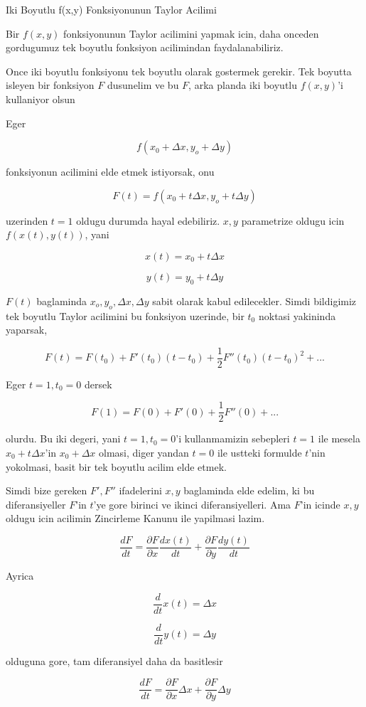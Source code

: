 \documentclass[12pt,fleqn]{article}\usepackage{../common}
\begin{document}
Iki Boyutlu f(x,y) Fonksiyonunun Taylor Acilimi

Bir $f(x,y)$ fonksiyonunun Taylor acilimini yapmak icin, daha onceden
gordugumuz tek boyutlu fonksiyon acilimindan faydalanabiliriz. 

Once iki boyutlu fonksiyonu tek boyutlu olarak gostermek gerekir. Tek
boyutta isleyen bir fonksiyon $F$ dusunelim ve bu $F$, arka planda iki
boyutlu $f(x,y)$'i kullaniyor olsun

Eger 

\[ f(x_0 +\Delta x, y_o + \Delta y) \]

fonksiyonun acilimini elde etmek istiyorsak, onu

\[ F(t) = f(x_0 + t\Delta x, y_o + t\Delta y) \]

uzerinden $t=1$ oldugu durumda hayal edebiliriz. $x,y$ parametrize 
oldugu icin  $f(x(t),y(t))$, yani

\[ x(t) = x_0 + t\Delta x \]

\[ y(t) = y_0 + t\Delta y \]

$F(t)$ baglaminda $x_o, y_o, \Delta x, \Delta y$ sabit olarak kabul edilecekler. Simdi bildigimiz
tek boyutlu Taylor acilimini bu fonksiyon uzerinde, bir $t_0$ noktasi yakininda 
yaparsak,

\[ F(t) = F(t_0) + F'(t_0)(t-t_0) + \frac{1}{2}F''(t_0)(t-t_0)^2 + ... \]

Eger $t=1,t_0=0$ dersek

\[ F(1) = F(0) + F'(0) + \frac{1}{2}F''(0) + ... \]

olurdu. Bu iki degeri, yani $t=1,t_0=0$'i kullanmamizin sebepleri $t=1$ ile
mesela $x_0 + t\Delta x$'in $x_0 + \Delta x$ olmasi, diger yandan $t=0$ ile
ustteki formulde $t$'nin yokolmasi, basit bir tek boyutlu acilim elde
etmek.

Simdi bize gereken $F',F''$ ifadelerini $x,y$ baglaminda elde edelim, ki bu
diferansiyeller $F$'in $t$'ye gore birinci ve ikinci diferansiyelleri. Ama
$F$'in icinde $x,y$ oldugu icin acilimin Zincirleme Kanunu ile yapilmasi
lazim.

\[ \frac{dF}{dt} = \frac{\partial F}{\partial x}\frac{dx(t)}{dt} +
\frac{\partial F}{\partial y}\frac{dy(t)}{dt} 
 \]

Ayrica

\[ \frac{d}{dt}x(t) = \Delta x \]

\[ \frac{d}{dt}y(t) = \Delta y \]

olduguna gore, tam diferansiyel daha da basitlesir

\[ \frac{dF}{dt} = \frac{\partial F}{\partial x}\Delta x +
\frac{\partial F}{\partial y}\Delta y
 \]
\end{document}
